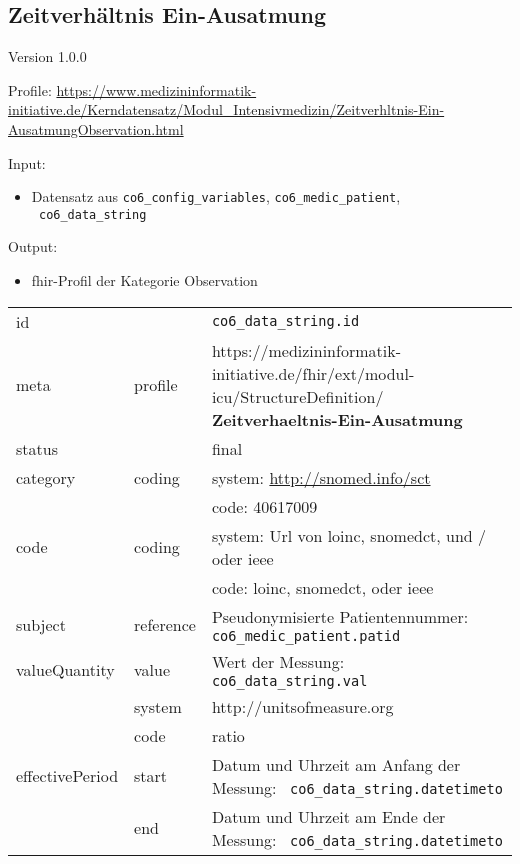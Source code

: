 \subsection{Zeitverhältnis Ein-Ausatmung} 
\noindent Version 1.0.0

\noindent Profile: \url{https://www.medizininformatik-initiative.de/Kerndatensatz/Modul_Intensivmedizin/Zeitverhltnis-Ein-AusatmungObservation.html}

\noindent Input:
\begin{itemize}
	\item Datensatz aus \texttt{co6\_config\_variables}, \texttt{co6\_medic\_patient}, \\ \texttt{
co6\_data\_string}
\end{itemize}
Output:
\begin{itemize}
        \item \ac{fhir}-Profil der Kategorie \glqq Observation\grqq{}
\end{itemize}
\begin{longtable}{|l|l|p{7.5cm}|}
        \hline
        \rowcolor{lightgray} \multicolumn{3}{|l|}{Data Mapping (inhaltlich)} \\ \hline
        id &  & \texttt{co6\_data\_string.id} \\ \hline
	meta & profile & https://medizininformatik-initiative.de/fhir/ext/modul-icu/StructureDefinition/\textbf{
Zeitverhaeltnis-Ein-Ausatmung} \\ \hline 
	status &  & final  \\ \hline 
	category & coding & system: \url{http://snomed.info/sct} \\
\cline{3-3}
	& & code: 40617009 \\ \hline
	code & coding & system: Url von \ac{loinc}, \ac{snomedct}, und / oder \ac{ieee} \\ 
	\cline{3-3} 
	 &  & code: \ac{loinc}, \ac{snomedct}, oder \ac{ieee} \\ \hline
	subject & reference & Pseudonymisierte Patientennummer: \texttt{co6\_medic\_patient.patid} \\ \hline
	valueQuantity & value & Wert der Messung: \texttt{
co6\_data\_string.val} \\
        \cline{2-3}
         & system & http://unitsofmeasure.org \\
         \cline{2-3}
         & code & {ratio} \\ \hline
    effectivePeriod & start & Datum und Uhrzeit am Anfang der Messung: \texttt{
co6\_data\_string.datetimeto} \\
    \cline{2-3}
     & end & Datum und Uhrzeit am Ende der Messung: \texttt{
co6\_data\_string.datetimeto} \\ \hline
\end{longtable}
\clearpage

